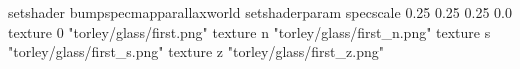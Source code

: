 setshader bumpspecmapparallaxworld
setshaderparam specscale 0.25 0.25 0.25 0.0
texture 0 "torley/glass/first.png"
texture n "torley/glass/first_n.png"
texture s "torley/glass/first_s.png"
texture z "torley/glass/first_z.png"

